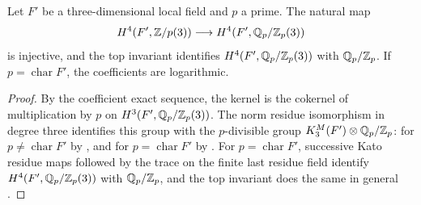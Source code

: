 \begin{lemma}\label{lem:second-three-coefficients}
Let $F'$ be a three-dimensional local field and $p$ a prime.
The natural map
\[
 H^4(F',\mathbb Z/p(3))\longrightarrow H^4(F',\mathbb Q_p/\mathbb Z_p(3))
\]
is injective, and the top invariant identifies $H^4(F',\mathbb Q_p/\mathbb Z_p(3))$ with $\mathbb Q_p/\mathbb Z_p$.
If $p=\operatorname{char}F'$, the coefficients are logarithmic.
\end{lemma}
\begin{proof}
By the coefficient exact sequence, the kernel is the cokernel of multiplication by $p$ on $H^3(F',\mathbb Q_p/\mathbb Z_p(3))$.
The norm residue isomorphism in degree three identifies this group with the $p$-divisible group $K_3^M(F')\otimes\mathbb Q_p/\mathbb Z_p$: for $p\ne\operatorname{char}F'$ by \cite[Theorems 6.16 and 6.17]{Voevodsky}, and for $p=\operatorname{char}F'$ by \cite[Corollary (2.8)]{BlochKato1986}.
For $p=\operatorname{char}F'$, successive Kato residue maps followed by the trace on the finite last residue field identify $H^4(F',\mathbb Q_p/\mathbb Z_p(3))$ with $\mathbb Q_p/\mathbb Z_p$, and the top invariant does the same in general \cite[\S5.2]{Kurihara2000}.
\end{proof}

